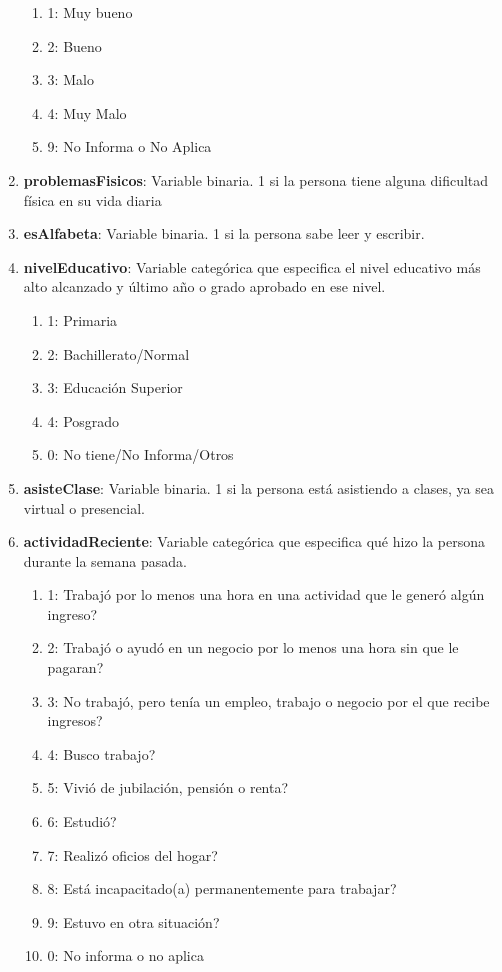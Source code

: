 \documentclass[12pt,a4paper]{article}
\begin{document}
\begin{enumerate}
\begin{enumerate}
			\item 1: Muy bueno
			\item 2: Bueno
			\item 3: Malo
			\item 4: Muy Malo
			\item 9: No Informa o No Aplica
		\end{enumerate}
	\item \textbf{problemasFisicos}: Variable binaria. 1 si la persona tiene alguna dificultad física en su vida diaria
	\item \textbf{esAlfabeta}: Variable binaria. 1 si la persona sabe leer y escribir.
	\item \textbf{nivelEducativo}: Variable categórica que especifica el nivel educativo más alto alcanzado y último año o grado aprobado en ese nivel.
		\begin{enumerate}
			\item 1: Primaria
			\item 2: Bachillerato/Normal 
			\item 3: Educación Superior
			\item 4: Posgrado 
			\item 0: No tiene/No Informa/Otros
		\end{enumerate}
	\item \textbf{asisteClase}: Variable binaria. 1 si la persona está asistiendo a clases, ya sea virtual o presencial.
	\item \textbf{actividadReciente}: Variable categórica que especifica qué hizo la persona durante la semana pasada.
		\begin{enumerate}
			\item 1: Trabajó por lo menos una hora en una actividad que le generó algún ingreso?
			\item 2: Trabajó o ayudó en un negocio por lo menos una hora sin que le pagaran?
			\item 3: No trabajó, pero tenía un empleo, trabajo o negocio por el que recibe ingresos?
			\item 4: Busco trabajo?
			\item 5: Vivió de jubilación, pensión o renta?
			\item 6: Estudió?
			\item 7: Realizó oficios del hogar?
			\item 8: Está incapacitado(a) permanentemente para trabajar?
			\item 9: Estuvo en otra situación?
			\item 0: No informa o no aplica

\end{enumerate}
\end{enumerate}
\end{document}
